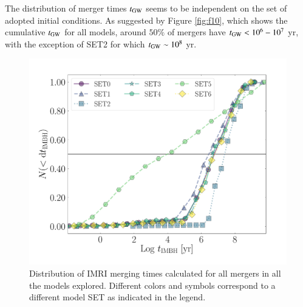 \documentclass[article]{aa}
\newcommand{\gw}{{\rm GW}}
\begin{document}
{The distribution of merger times $t_\gw$ seems to be independent on the set of adopted initial conditions. As suggested by Figure \ref{fig:f10}, which shows the cumulative $t_\gw$ for all models, around $50\%$ of mergers have $t_{\gw} < 10^6 - 10^7$ yr, with the exception of SET2 for which  $t_{\gw} \sim 10^8$ yr. 


\begin{figure}
\includegraphics[width=\columnwidth]{time}
    \caption{Distribution of IMRI merging times calculated for all mergers in all the models explored. Different colors and symbols correspond to a different model SET as indicated in the legend.}
	\label{fig:f10a}
\end{figure}



}
\end{document}
